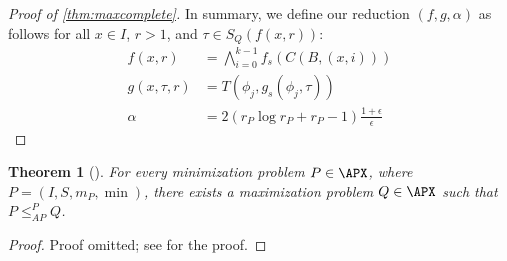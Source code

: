 \documentclass[]{article}
\theoremstyle{plain}
\newtheorem{theorem}{Theorem}
\theoremstyle{definition}
\newcommand{\APr}{\leq_{AP}^{P}}
\newcommand{\ceil}[1]{\lceil{#1}\rceil}
\begin{document}
\begin{proof}[Proof of \autoref{thm:maxcomplete}]
  In summary, we define our reduction $(f, g, \alpha)$ as follows for all $x \in I$, $r > 1$, and $\tau \in S_Q(f(x, r))$:
  \begin{align*}
    f(x, r) & = \bigwedge_{i = 0}^{k - 1}{f_s(C(B, (x, i)))} \\
    g(x, \tau, r) & = T(\phi_j, g_s(\phi_j, \tau)) \\
    \alpha & = 2(r_P \log{r_P} + r_P - 1)\frac{1 + \epsilon}{\epsilon}
  \end{align*}
\end{proof}

\begin{theorem}[{\cite[Theorem~8.7]{book}}]\label{thm:minmax}
  For every minimization problem $P \in \APX$, where $P = (I, S, m_P, \min)$, there exists a maximization problem $Q \in \APX$ such that $P \APr Q$.
\end{theorem}
\begin{proof}
  Proof omitted; see \cite{book} for the proof.
\end{proof}

\end{document}
